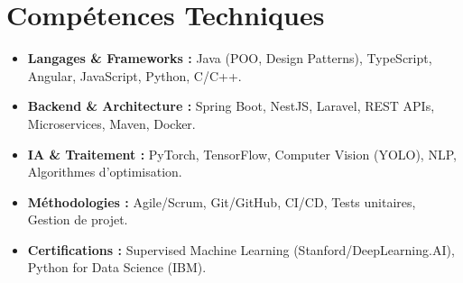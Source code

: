 \documentclass[a4paper,11pt]{article}
\begin{document}
\section{Compétences Techniques}
\begin{itemize}[leftmargin=*, nosep]
    \item \small{\textbf{Langages \& Frameworks :} Java (POO, Design Patterns), TypeScript, Angular, JavaScript, Python, C/C++.}
    \item \small{\textbf{Backend \& Architecture :} Spring Boot, NestJS, Laravel, REST APIs, Microservices, Maven, Docker.}
    \item \small{\textbf{IA \& Traitement :} PyTorch, TensorFlow, Computer Vision (YOLO), NLP, Algorithmes d'optimisation.}
    \item \small{\textbf{Méthodologies :} Agile/Scrum, Git/GitHub, CI/CD, Tests unitaires, Gestion de projet.}
    \item \small{\textbf{Certifications :} Supervised Machine Learning (Stanford/DeepLearning.AI), Python for Data Science (IBM).}
\end{itemize}

\end{document}
